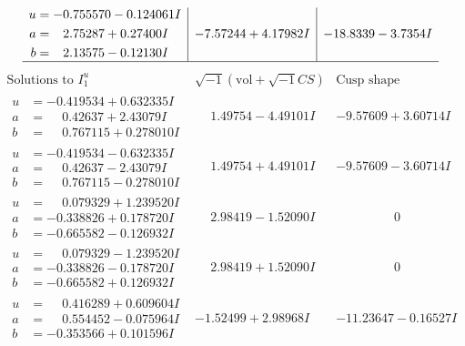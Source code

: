 \documentclass[1p]{elsarticle_modified}
\theoremstyle{definition}
\newcommand{\I}{\sqrt{-1}}
\begin{document}
$$\begin{array}{c|c|c}
\begin{aligned}
u &= -0.755570 - 0.124061 I \\
a &= \phantom{-}2.75287 + 0.27400 I \\
b &= \phantom{-}2.13575 - 0.12130 I\end{aligned}
 & -7.57244 + 4.17982 I & -18.8339 - 3.7354 I\\
 \hline 
 \end{array}$$\newpage$$\begin{array}{c|c|c}  
\text{Solutions to }I^u_{1}& \I (\text{vol} + \sqrt{-1}CS) & \text{Cusp shape}\\
 \hline 
\begin{aligned}
u &= -0.419534 + 0.632335 I \\
a &= \phantom{-}0.42637 + 2.43079 I \\
b &= \phantom{-}0.767115 + 0.278010 I\end{aligned}
 & \phantom{-}1.49754 - 4.49101 I & -9.57609 + 3.60714 I \\ \hline\begin{aligned}
u &= -0.419534 - 0.632335 I \\
a &= \phantom{-}0.42637 - 2.43079 I \\
b &= \phantom{-}0.767115 - 0.278010 I\end{aligned}
 & \phantom{-}1.49754 + 4.49101 I & -9.57609 - 3.60714 I \\ \hline\begin{aligned}
u &= \phantom{-}0.079329 + 1.239520 I \\
a &= -0.338826 + 0.178720 I \\
b &= -0.665582 - 0.126932 I\end{aligned}
 & \phantom{-}2.98419 - 1.52090 I & \phantom{-0.000000 } 0 \\ \hline\begin{aligned}
u &= \phantom{-}0.079329 - 1.239520 I \\
a &= -0.338826 - 0.178720 I \\
b &= -0.665582 + 0.126932 I\end{aligned}
 & \phantom{-}2.98419 + 1.52090 I & \phantom{-0.000000 } 0 \\ \hline\begin{aligned}
u &= \phantom{-}0.416289 + 0.609604 I \\
a &= \phantom{-}0.554452 - 0.075964 I \\
b &= -0.353566 + 0.101596 I\end{aligned}
 & -1.52499 + 2.98968 I & -11.23647 - 0.16527 I \\ \hline\begin{aligned}

\end{aligned}
\end{array}$$
\end{document}
